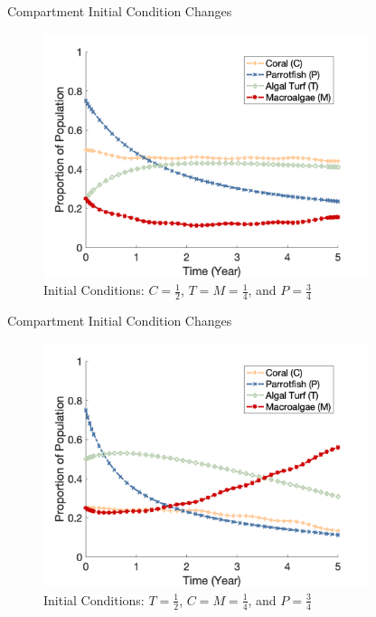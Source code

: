 \documentclass{beamer}
\begin{document}
\begin{frame}{Compartment Initial Condition Changes}
    \begin{figure}
        \centering
        \includegraphics[width=0.85\textwidth]{Latex/Figures/Graphs/0.5C_0.25T_0.25M.png}
        \caption{Initial Conditions: $C = \frac{1}{2}$, $T = M = \frac{1}{4}$, and $P = \frac{3}{4}$}
        \label{fig:coral_dominant}
    \end{figure}
\end{frame}

\begin{frame}{Compartment Initial Condition Changes}
    \begin{figure}
        \centering
        \includegraphics[width=0.85\textwidth]{Latex/Figures/Graphs/0.25C_0.5T_0.25M.png}
        \caption{Initial Conditions: $T = \frac{1}{2}$, $C = M = \frac{1}{4}$, and $P = \frac{3}{4}$}
        \label{fig:turf_dominant}
    \end{figure}
\end{frame}
\end{document}
